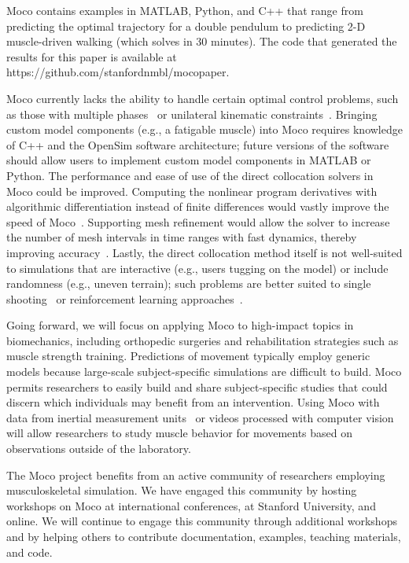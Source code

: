 \documentclass[10pt,letterpaper]{article}
\begin{document}
Moco contains examples in MATLAB, Python, and C++ that range from predicting the optimal trajectory for a double pendulum to predicting 2-D muscle-driven walking (which solves in 30 minutes). The code that generated the results for this paper is available at https://github.com/stanfordnmbl/mocopaper.

Moco currently lacks the ability to handle certain optimal control problems, such as those with multiple phases~\cite{Falisse:2017} or unilateral kinematic constraints~\cite{Patel:2019}. Bringing custom model components (e.g., a fatigable muscle) into Moco requires knowledge of C++ and the OpenSim software architecture; future versions of the software should allow users to implement custom model components in MATLAB or Python. The performance and ease of use of the direct collocation solvers in Moco could be improved. Computing the nonlinear program derivatives with algorithmic differentiation instead of finite differences would vastly improve the speed of Moco~\cite{Falisse:2019a}. Supporting mesh refinement would allow the solver to increase the number of mesh intervals in time ranges with fast dynamics, thereby improving accuracy~\cite{Betts:2010}. Lastly, the direct collocation method itself is not well-suited to simulations that are interactive (e.g., users tugging on the model) or include randomness (e.g., uneven terrain); such problems are better suited to single shooting~\cite{Ong:2019} or reinforcement learning approaches~\cite{Kidzinski:2019}.

Going forward, we will focus on applying Moco to high-impact topics in biomechanics, including orthopedic surgeries and rehabilitation strategies such as muscle strength training. Predictions of movement typically employ generic models because large-scale subject-specific simulations are difficult to build. Moco permits researchers to easily build and share subject-specific studies that could discern which individuals may benefit from an intervention. Using Moco with data from inertial measurement units~\cite{Dorschky:2019} or videos processed with computer vision~\cite{OpenPose:2019} will allow researchers to study muscle behavior for movements based on observations outside of the laboratory.

The Moco project benefits from an active community of researchers employing musculoskeletal simulation. We have engaged this community by hosting workshops on Moco at international conferences, at Stanford University, and online. We will continue to engage this community through additional workshops and by helping others to contribute documentation, examples, teaching materials, and code.
\end{document}
